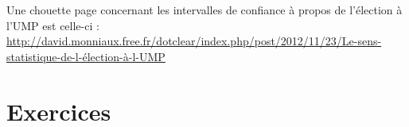 Une chouette page concernant les intervalles de confiance à propos de l'élection à l'UMP est celle-ci :\\
\url{http://david.monniaux.free.fr/dotclear/index.php/post/2012/11/23/Le-sens-statistique-de-l-élection-à-l-UMP}

\section{Exercices}



